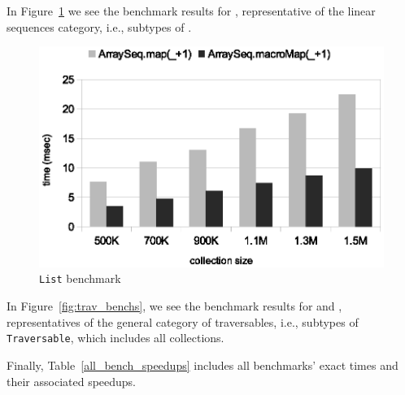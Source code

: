 In Figure~\ref{fig:lin_bench} we see the benchmark results for ,
representative of the linear sequences category, i.e., subtypes of .

\begin{figure}
\centering
\includegraphics[scale=0.7]{figures/arrayseq_bench.eps}
\caption[\texttt{List} benchmark]{\texttt{List} benchmark}
\label{fig:lin_bench}
\end{figure}

% 
% 


In Figure~\ref{fig:trav_benchs}, we see the benchmark results for
 and ,
representatives of the general category of traversables, i.e., subtypes of \texttt{Traversable}, which includes all collections.

Finally, Table~\ref{all_bench_speedups} includes all benchmarks' exact times and their associated speedups.


